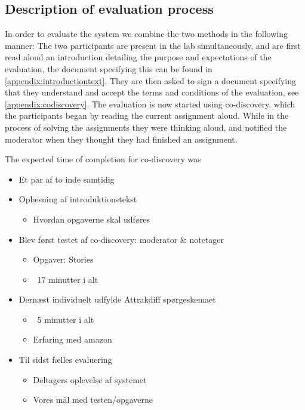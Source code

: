 \subsection{Description of evaluation process}
In order to evaluate the system we combine the two methods in the following manner: The two participants are present in the lab simultaneously, and are first read aloud an introduction detailing the purpose and expectations of the evaluation, the document specifying this can be found in \autoref{appendix:introductiontext}. They are then asked to sign a document specifying that they understand and accept the terms and conditions of the evaluation, see \autoref{appendix:codiscovery}.
The evaluation is now started using co-discovery, which the participants began by reading the current assignment aloud. While in the process of solving the assignments they were thinking aloud, and notified the moderator when they thought they had finished an assignment. 

The expected time of completion for co-discovery was 
\begin{itemize}
\item Et par af to inde samtidig
\item Oplæsning af introduktionstekst
\begin{itemize}
\item Hvordan opgaverne skal udføres
\end{itemize}
\item Blev først testet af co-discovery: moderator \& notetager
\begin{itemize}
\item Opgaver: Stories
\item ~17 minutter i alt
\end{itemize}
\item Dern\ae st individuelt udfylde Attrakdiff spørgeskemaet
\begin{itemize}
\item ~5 minutter i alt
\item Erfaring med amazon
\end{itemize}
\item Til sidst fælles evaluering
\begin{itemize}
\item Deltagers oplevelse af systemet
\item Vores m\aa l med testen/opgaverne
\end{itemize}
\end{itemize}